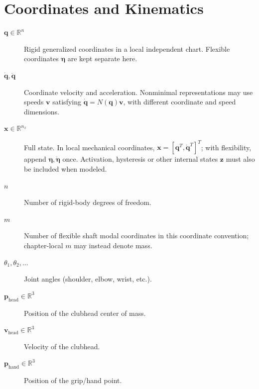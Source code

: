 \section*{Coordinates and Kinematics}
\begin{description}
    \item[$\bm{q} \in \mathbb{R}^n$] Rigid generalized coordinates in a local independent chart. Flexible coordinates $\bm{\eta}$ are kept separate here.
    \item[$\dot{\bm{q}}, \ddot{\bm{q}}$] Coordinate velocity and acceleration. Nonminimal representations may use speeds $\bm{v}$ satisfying $\dot{\bm{q}}=N(\bm{q})\bm{v}$, with different coordinate and speed dimensions.
    \item[$\bm{x} \in \mathbb{R}^{n_x}$] Full state. In local mechanical coordinates, $\bm{x}=[\bm{q}^T,\dot{\bm{q}}^T]^T$; with flexibility, append $\bm{\eta},\dot{\bm{\eta}}$ once. Activation, hysteresis or other internal states $\bm{z}$ must also be included when modeled.
    \item[$n$] Number of rigid-body degrees of freedom.
    \item[$m$] Number of flexible shaft modal coordinates in this coordinate convention; chapter-local $m$ may instead denote mass.
    \item[$\theta_1, \theta_2, \ldots$] Joint angles (shoulder, elbow, wrist, etc.).
    \item[$\bm{p}_{\mathrm{head}} \in \mathbb{R}^3$] Position of the clubhead center of mass.
    \item[$\bm{v}_{\mathrm{head}} \in \mathbb{R}^3$] Velocity of the clubhead.
    \item[$\bm{p}_{\mathrm{hand}} \in \mathbb{R}^3$] Position of the grip/hand point.
\end{description}

